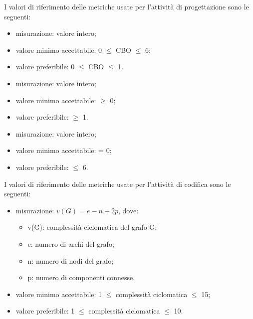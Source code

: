 		I valori di riferimento delle metriche usate per l'attività di progettazione sono le seguenti:
		
				\begin{itemize}
					\item{misurazione: valore intero;}
					\item{valore minimo accettabile: 0 $\leq$ CBO $\leq$ 6;}
					\item{valore preferibile: 0 $\leq$ CBO $\leq$ 1.}
				\end{itemize}

		
				\begin{itemize}
					\item{misurazione: valore intero;}
					\item{valore minimo accettabile: $\geq$ 0;}
					\item{valore preferibile: $\geq$ 1.}
				\end{itemize}
	
				\begin{itemize}
					\item{misurazione: valore intero;}
					\item{valore minimo accettabile: = 0;}
					\item{valore preferibile: $\leq$ 6.}
				\end{itemize}
		
		I valori di riferimento delle metriche usate per l'attività di codifica sono le seguenti:
					
			\begin{itemize}
				\item{misurazione: $v(G) = e - n + 2p$, dove: 
				\begin{itemize}
					\item{v(G)}: complessità ciclomatica del grafo G; 
					\item{e}: numero di archi del grafo; 
					\item{n}: numero di nodi del grafo; 
					\item{p}: numero di componenti connesse. 
				\end{itemize} }
				\item{valore minimo accettabile: 1 $\leq$ complessità ciclomatica $\leq$ 15;}
				\item{valore preferibile: 1 $\leq$ complessità ciclomatica $\leq$ 10.}
			\end{itemize}
			
